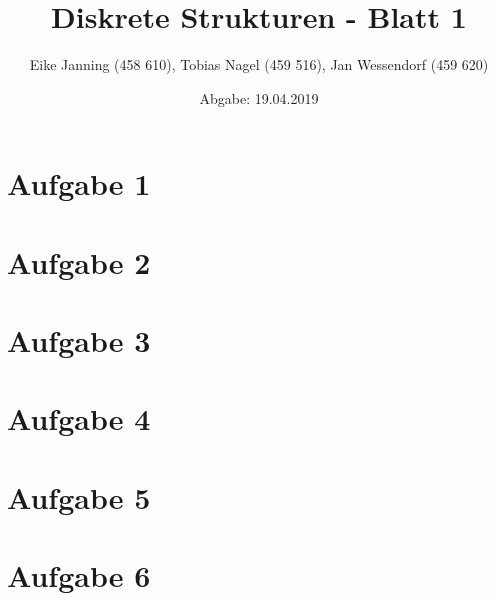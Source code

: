 \documentclass[11pt]{article}
\title{Diskrete Strukturen - Blatt 1}
\author{Eike Janning (458 610), Tobias Nagel (459 516), Jan Wessendorf (459 620)}
\date{Abgabe: 19.04.2019}
\begin{document}
\maketitle

\section*{Aufgabe 1}

\pagebreak

\section*{Aufgabe 2}

\pagebreak

\section*{Aufgabe 3}

\pagebreak

\section*{Aufgabe 4}

\pagebreak

\section*{Aufgabe 5}

\pagebreak

\section*{Aufgabe 6}

\pagebreak
\end{document}
